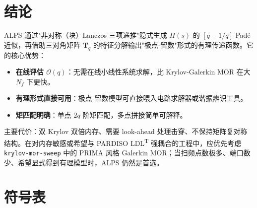 \documentclass[11pt,a4paper]{ctexart}
\begin{document}
\section{结论}

ALPS 通过"非对称（块）Lanczos 三项递推"隐式生成 $H(s)$ 的 $[q-1/q]$ Padé 近似，再借助三对角矩阵 $\bm T_q$ 的特征分解输出"极点-留数"形式的有理传递函数。它的核心优势：

\begin{itemize}
\item \textbf{在线评估 $\mathcal O(q)$}：无需在线小线性系统求解，比 Krylov-Galerkin MOR 在大 $N_f$ 下更快。
\item \textbf{有理形式直接可用}：极点-留数模型可直接喂入电路求解器或谐振辨识工具。
\item \textbf{矩匹配明确}：单点 $2q$ 阶矩匹配，多点拼接简单可解释。
\end{itemize}

主要代价：双 Krylov 双倍内存、需要 look-ahead 处理击穿、不保持矩阵复对称结构。在对内存敏感或希望与 PARDISO LDL\textsuperscript{T} 强耦合的工程中，应优先考虑 \texttt{krylov-mor-sweep} 中的 PRIMA 风格 Galerkin MOR；当扫频点数极多、端口数少、希望显式得到有理模型时，ALPS 仍然是首选。

\section{符号表}
\end{document}
